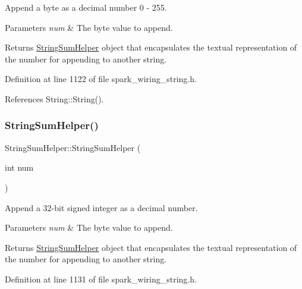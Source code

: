 Append a byte as a decimal number 0 -\/ 255. 


\begin{DoxyParams}{Parameters}
{\em num} & The byte value to append.\\
\hline
\end{DoxyParams}
\begin{DoxyReturn}{Returns}
\hyperlink{class_string_sum_helper}{String\+Sum\+Helper} object that encapsulates the textual representation of the number for appending to another string. 
\end{DoxyReturn}


Definition at line 1122 of file spark\+\_\+wiring\+\_\+string.\+h.



References String\+::\+String().

\mbox{\label{class_string_sum_helper_acb28b89b1f39f1140ab097439c967e22}} 
\subsubsection{\texorpdfstring{String\+Sum\+Helper()}{StringSumHelper()}\hspace{0.1cm}{\footnotesize\ttfamily [5/8]}}
{\footnotesize\ttfamily String\+Sum\+Helper\+::\+String\+Sum\+Helper (\begin{DoxyParamCaption}\item[{int}]{num }\end{DoxyParamCaption})\hspace{0.3cm}{\ttfamily [inline]}}



Append a 32-\/bit signed integer as a decimal number. 


\begin{DoxyParams}{Parameters}
{\em num} & The byte value to append.\\
\hline
\end{DoxyParams}
\begin{DoxyReturn}{Returns}
\hyperlink{class_string_sum_helper}{String\+Sum\+Helper} object that encapsulates the textual representation of the number for appending to another string. 
\end{DoxyReturn}


Definition at line 1131 of file spark\+\_\+wiring\+\_\+string.\+h.



